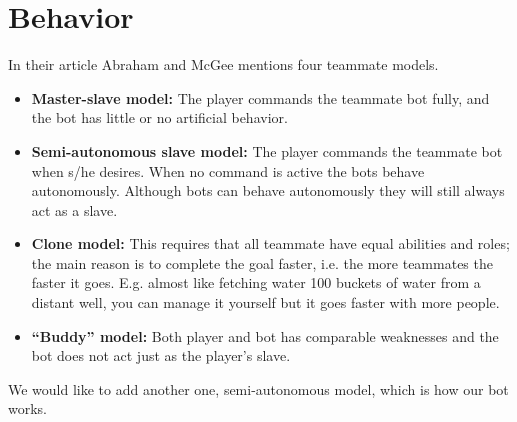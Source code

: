 \section{Behavior}
In their article\cite{abraham10} Abraham and McGee mentions four teammate models.
\begin{itemize}
	\item \textbf{Master-slave model:} The player commands the teammate bot fully, and the bot has little or no artificial behavior.
	\item \textbf{Semi-autonomous slave model:} The player commands the teammate bot when s/he desires. When no command is active the bots behave autonomously. Although bots can behave autonomously they will still always act as a slave.
	\item \textbf{Clone model:} This requires that all teammate have equal abilities and roles; the main reason is to complete the goal faster, i.e. the more teammates the faster it goes. E.g. almost like fetching water 100 buckets of water from a distant well, you can manage it yourself but it goes faster with more people.
	\item \textbf{“Buddy” model:} Both player and bot has comparable weaknesses and the bot does not act just as the player’s slave.
\end{itemize}
We would like to add another one, semi-autonomous model, which is how our bot works.